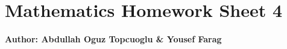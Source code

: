 \documentclass{article}
\begin{document}
\section*{\huge Mathematics Homework Sheet 4}
\begin{flushright}
   \textbf{Author: Abdullah Oguz Topcuoglu \& Yousef Farag}
\end{flushright}
\end{document}
